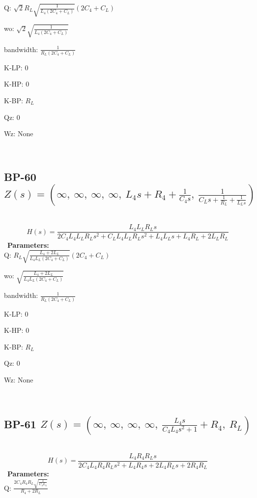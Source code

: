 \documentclass{article}
\begin{document}
Q: $\sqrt{2} R_{L} \sqrt{\frac{1}{L_{4} \left(2 C_{4} + C_{L}\right)}} \left(2 C_{4} + C_{L}\right)$\ 

wo: $\sqrt{2} \sqrt{\frac{1}{L_{4} \left(2 C_{4} + C_{L}\right)}}$\ 

bandwidth: $\frac{1}{R_{L} \left(2 C_{4} + C_{L}\right)}$\ 

K-LP: $0$\ 

K-HP: $0$\ 

K-BP: $R_{L}$\ 

Qz: $0$\ 

Wz: $\text{None}$\ 

\ 

\subsection{BP-60 $Z(s) = \left( \infty, \  \infty, \  \infty, \  \infty, \  L_{4} s + R_{4} + \frac{1}{C_{4} s}, \  \frac{1}{C_{L} s + \frac{1}{R_{L}} + \frac{1}{L_{L} s}}\right)$ } \ 
\textbf{\[H(s) = \frac{L_{4} L_{L} R_{L} s}{2 C_{4} L_{4} L_{L} R_{L} s^{2} + C_{L} L_{4} L_{L} R_{L} s^{2} + L_{4} L_{L} s + L_{4} R_{L} + 2 L_{L} R_{L}}\] } \ 
\textbf{Parameters:}\\ 

Q: $R_{L} \sqrt{\frac{L_{4} + 2 L_{L}}{L_{4} L_{L} \left(2 C_{4} + C_{L}\right)}} \left(2 C_{4} + C_{L}\right)$\ 

wo: $\sqrt{\frac{L_{4} + 2 L_{L}}{L_{4} L_{L} \left(2 C_{4} + C_{L}\right)}}$\ 

bandwidth: $\frac{1}{R_{L} \left(2 C_{4} + C_{L}\right)}$\ 

K-LP: $0$\ 

K-HP: $0$\ 

K-BP: $R_{L}$\ 

Qz: $0$\ 

Wz: $\text{None}$\ 

\ 

\subsection{BP-61 $Z(s) = \left( \infty, \  \infty, \  \infty, \  \infty, \  \frac{L_{4} s}{C_{4} L_{4} s^{2} + 1} + R_{4}, \  R_{L}\right)$ } \ 
\textbf{\[H(s) = \frac{L_{4} R_{4} R_{L} s}{2 C_{4} L_{4} R_{4} R_{L} s^{2} + L_{4} R_{4} s + 2 L_{4} R_{L} s + 2 R_{4} R_{L}}\] } \ 
\textbf{Parameters:}\\ 

Q: $\frac{2 C_{4} R_{4} R_{L} \sqrt{\frac{1}{C_{4} L_{4}}}}{R_{4} + 2 R_{L}}$\ 
\end{document}
